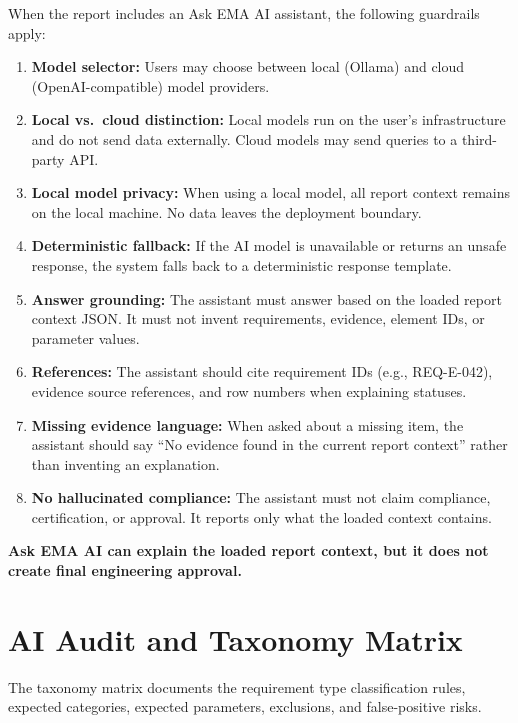 \documentclass[10pt,letterpaper]{article}
\newcommand{\guardrailbox}[1]{%
\begin{tcolorbox}[colback=guardrailBlue,colframe=guardrailBorder,
    boxrule=0.6pt,arc=2mm,left=10pt,right=10pt,top=8pt,bottom=8pt]\small #1%
\end{tcolorbox}}
\begin{document}
When the report includes an Ask EMA AI assistant, the following guardrails apply:

\begin{enumerate}
  \item \textbf{Model selector:} Users may choose between local (Ollama) and cloud (OpenAI-compatible)
        model providers.
  \item \textbf{Local vs.\ cloud distinction:} Local models run on the user's infrastructure and do
        not send data externally. Cloud models may send queries to a third-party API.
  \item \textbf{Local model privacy:} When using a local model, all report context remains on the
        local machine. No data leaves the deployment boundary.
  \item \textbf{Deterministic fallback:} If the AI model is unavailable or returns an unsafe
        response, the system falls back to a deterministic response template.
  \item \textbf{Answer grounding:} The assistant must answer based on the loaded report context
        JSON. It must not invent requirements, evidence, element IDs, or parameter values.
  \item \textbf{References:} The assistant should cite requirement IDs (e.g., REQ-E-042), evidence
        source references, and row numbers when explaining statuses.
  \item \textbf{Missing evidence language:} When asked about a missing item, the assistant should
        say ``No evidence found in the current report context'' rather than inventing an explanation.
  \item \textbf{No hallucinated compliance:} The assistant must not claim compliance, certification,
        or approval. It reports only what the loaded context contains.
\end{enumerate}

\guardrailbox{\textbf{Ask EMA AI can explain the loaded report context, but it does not create final
  engineering approval.}}

\section{AI Audit and Taxonomy Matrix}

The taxonomy matrix documents the requirement type classification rules, expected categories,
expected parameters, exclusions, and false-positive risks.
\end{document}
